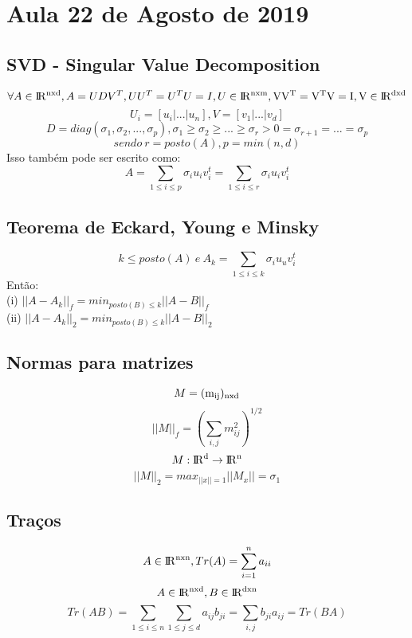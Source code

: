 \documentclass[a4paper,12pt]{article}
\begin{document}
\section{Aula 22 de Agosto de 2019}
\label{2019_08_22}

\subsection{SVD - Singular Value Decomposition}

\[ \forall A \in {\rm I\!R^{nxd}} , A = UDV^T, UU^T = U^TU = I, U \in \rm I\!R^{nxm},VV^T = V^TV = I, V \in \rm I\!R^{dxd} \]
\[U_i = [ u_i | ... | u_n ], V = [v_1 | ... | v_d]\]
\[D = diag(\sigma_1,\sigma_2,...,\sigma_p), \sigma_1 \geq \sigma_2 \geq ... \geq \sigma_r > 0 = \sigma_{r+1} = ... = \sigma_p \]
\[sendo\ r = posto(A), p = min(n,d)\]
Isso também pode ser escrito como: 
\[A = \sum_{1 \leq i \leq p} \sigma_i u_i v_i^t =  \sum_{1 \leq i \leq r} \sigma_i u_i v_i^t \]

\subsection{Teorema de Eckard, Young e Minsky}

\[k\leq posto(A) \ e \ A_k = \sum_{1\leq i \leq k} \sigma_i u_u v_i^t\]
Então:\\

(i) $ ||A-A_k||_f = min_{posto(B) \leq k} ||A-B||_f $\\

(ii) $ ||A-A_k||_2 = min_{posto(B) \leq k} ||A-B||_2 $

\subsection{Normas para matrizes}

\[M = \rm{(m_{ij})_{nxd}}\]
\[||M||_f = ( \sum_{i,j} m_{ij}^2)^{1/2} \]
\[M:  {\rm I\!R^{d}} \rightarrow  {\rm I\!R^{n}} \]
\[||M||_2 = max_{||x||=1} ||M_x|| = \sigma_1\]

\subsection{Traços}

\[A\in {\rm I\!R^{nxn}}, Tr(A) = \sum_{i=1}^n a_{ii}\]
\[A \in   {\rm I\!R^{nxd}}, B \in   {\rm I\!R^{dxn}} \]
\[Tr(AB) =  \sum_{1 \leq i \leq n} \sum_{1\leq j \leq d} a_{ij}b_{ji} = \sum_{i,j} b_{ji} a_{ij} = Tr(BA)\]\\
\end{document}

